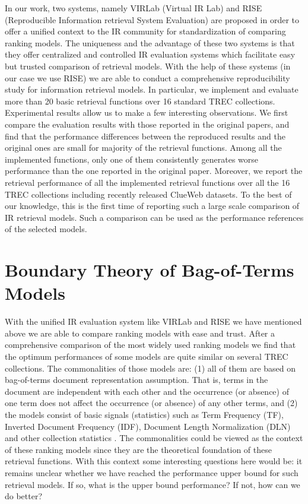 In our work, two systems, namely VIRLab (Virtual IR Lab) 
\cite{Fang:2014:VWV:2600428.2611178} 
and RISE (Reproducible Information retrieval System Evaluation) 
\cite{Yang:2016:RSI:2970398.2970415} are proposed in order to offer 
a unified context to the IR community for standardization of comparing 
ranking models. The uniqueness and the advantage of these two systems is 
that they offer centralized and controlled IR evaluation systems which 
facilitate easy but trusted comparison of retrieval models. 
With the help of these systems (in our case we use RISE) 
we are able to conduct a comprehensive reproducibility study for information 
retrieval models. 
In particular, we implement and evaluate more than 20 basic retrieval 
functions over 16 standard TREC collections. Experimental results allow us to 
make a few interesting observations. We first compare the evaluation results 
with those reported in the original papers, and find that the performance 
differences between the reproduced results and the original ones are small 
for majority of the retrieval functions. Among all the implemented functions, 
only one of them consistently generates worse performance than the one 
reported in the original paper. Moreover, we report the retrieval 
performance of all the implemented retrieval functions over all the 16 
TREC collections including recently released ClueWeb datasets. 
To the best of our knowledge, this is the first time of reporting such a 
large scale comparison of IR retrieval models. Such a comparison can be used 
as the performance references of the selected models.


\section{Boundary Theory of Bag-of-Terms Models}
With the unified IR evaluation system like VIRLab and RISE we have mentioned 
above we are able to compare ranking models with ease and trust. 
After a comprehensive comparison of the most widely used ranking models 
\cite{Yang:2016:RSI:2970398.2970415,Yang:2016:ERP:2970398.2970428} 
we find that the optimum performances of some models 
\cite{Robertson96okapiat3,Singhal:1996:PDL:243199.243206,
Zhai:2004:SSM:984321.984322,Amati:2002:PMI:582415.582416,
Fang:2005:EAA:1076034.1076116,Lv:2011:LTF:2063576.2063584,
He:2005:SDP:1076034.1076114}
are quite similar on several TREC collections. 
The commonalities of those models are: 
(1) all of them are based on bag-of-terms document representation assumption. 
That is, terms in the document are independent with each other and the 
occurrence (or absence) of one term does not affect the occurrence (or absence) 
of any other terms, and   
(2) the models consist of basic signals (statistics) such as 
Term Frequency (TF), Inverted Document Frequency (IDF), 
Document Length Normalization (DLN) and other collection statistics 
\cite{Fang:2004:FSI:1008992.1009004}. 
The commonalities could be viewed as the context of these ranking models 
since they are the theoretical foundation of these retrieval functions.
With this context some interesting questions here would be: 
it remains unclear whether we have reached the performance upper bound for 
such retrieval models. 
If so, what is the upper bound performance? If not, how can we do better?

